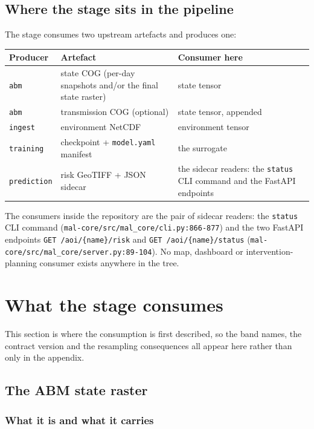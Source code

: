 \documentclass[11pt,a4paper]{article}
\newcommand{\code}[1]{\texttt{#1}}
\begin{document}
\subsection{Where the stage sits in the pipeline}

The stage consumes two upstream artefacts and produces one:

\begin{center}
\begin{tabular}{@{}lll@{}}
\toprule
Producer & Artefact & Consumer here \\
\midrule
\code{abm} & state COG (per-day snapshots and/or the final state raster) &
state tensor \\
\code{abm} & transmission COG (optional) & state tensor, appended \\
\code{ingest} & environment NetCDF & environment tensor \\
\code{training} & checkpoint + \code{model.yaml} manifest & the surrogate \\
\midrule
\code{prediction} & risk GeoTIFF + JSON sidecar & the sidecar readers: the
\code{status} CLI command and the FastAPI endpoints \\
\bottomrule
\end{tabular}
\end{center}

The consumers inside the repository are the pair of sidecar readers: the
\code{status} CLI command
(\code{mal-core/src/mal\_core/cli.py:866-877}) and the two FastAPI endpoints
\code{GET /aoi/\{name\}/risk} and \code{GET /aoi/\{name\}/status}
(\code{mal-core/src/mal\_core/server.py:89-104}). No map, dashboard or
intervention-planning consumer exists anywhere in the tree.

\section{What the stage consumes}

This section is where the consumption is first described, so the band names,
the contract version and the resampling consequences all appear here rather
than only in the appendix.

\subsection{The ABM state raster}

\subsubsection{What it is and what it carries}
\end{document}
